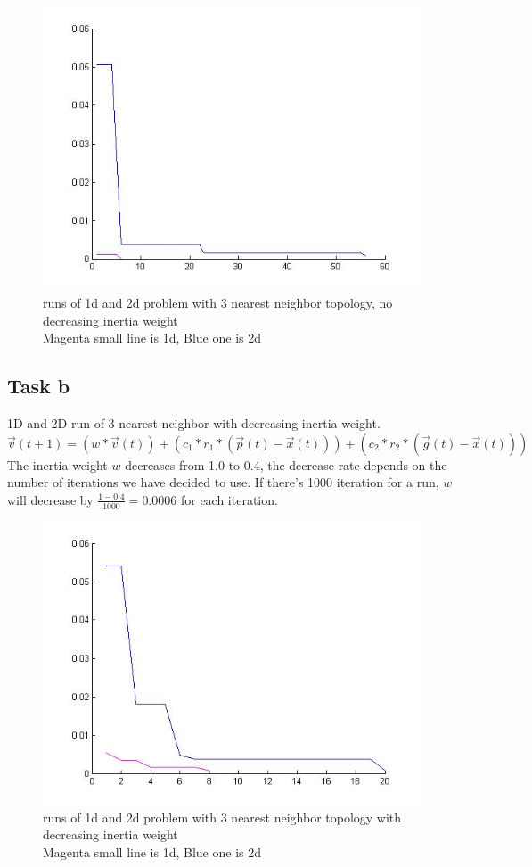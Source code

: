 \documentclass[12pt, a4paper]{article}
\begin{document}
\begin{figure}[H]

\includegraphics{3nn_no_inertia}
\caption{runs of 1d and 2d problem with 3 nearest neighbor topology, no decreasing inertia weight\\
Magenta small line is 1d, Blue one is 2d}


\end{figure}
\subsection{Task b}
1D and 2D run of 3 nearest neighbor with decreasing inertia weight.
$\vec{v}(t+1)=(w*\vec{v}(t))+(c_1*r_1*(\vec{p}(t)-\vec{x}(t))) +(c_2*r_2*(\vec{g}(t)-\vec{x}(t)))$\\
The inertia weight $w$ decreases from 1.0 to 0.4, the decrease rate depends on the number of iterations we have decided to use. If there's 1000 iteration for a run, $w$ will decrease by $\frac{1-0.4}{1000} = 0.0006
$ for each iteration.
\begin{figure}[H]
\begin{center}
\includegraphics{3nn_with_inertia}
\caption{runs of 1d and 2d problem with 3 nearest neighbor topology with decreasing inertia weight\\
Magenta small line is 1d, Blue one is 2d}
\end{center}

\end{figure}
\end{document}
